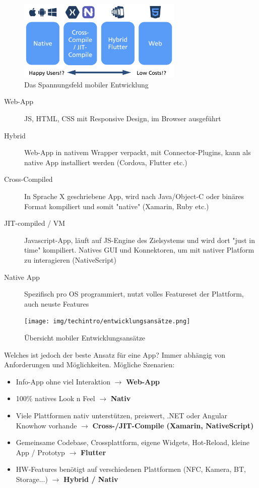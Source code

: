\documentclass[a4paper]{article}
\begin{document}
		\begin{figure}[htb!]
			\centering
			\includegraphics[width=0.7\textwidth]{img/techintro/spannungsfeld_apps.png}
			\caption{Das Spannungsfeld mobiler Entwicklung}
			\label{fig:techintro_spannungsfeld_apps}
		\end{figure}
	
		\begin{description}
			\item[Web-App] JS, HTML, CSS mit Responsive Design, im Browser ausgeführt
			\item[Hybrid] Web-App in nativem Wrapper verpackt, mit Connector-Plugins, kann als native App installiert werden (Cordova, Flutter etc.)
			\item[Cross-Compiled] In Sprache X geschriebene App, wird nach Java/Object-C oder binäres Format kompiliert und somit "native" (Xamarin, Ruby etc.)
			\item[JIT-compiled / VM] Javascript-App, läuft auf JS-Engine des Zielsystems und wird dort "just in time" kompiliert.
			Natives GUI und Konnektoren, um mit nativer Platform zu interagieren (NativeScript)
			\item[Native App] Spezifisch pro OS programmiert, nutzt volles Featureset der Plattform, auch neuste Features
		\end{description}
	
		\begin{figure}[htb!]
			\centering
			\texttt{[image: img/techintro/entwicklungsansätze.png]}
			\caption{Übersicht mobiler Entwicklungsansätze}
			\label{fig:techintro_entwicklungsansätze}
		\end{figure}
	
		\newpage
	
		Welches ist jedoch der beste Ansatz für eine App?
		Immer abhängig von Anforderungen und Möglichkeiten.
		Mögliche Szenarien:
		
		\begin{itemize}
			\item Info-App ohne viel Interaktion $\rightarrow$ \textbf{Web-App}
			\item 100\% natives Look n Feel $\rightarrow$ \textbf{Nativ}
			\item Viele Plattformen nativ unterstützen, preiswert, .NET oder Angular Knowhow vorhande $\rightarrow$ \textbf{Cross-/JIT-Compile (Xamarin, NativeScript)}
			\item Gemeinsame Codebase, Crossplattform, eigene Widgets, Hot-Reload, kleine App / Prototyp $\rightarrow$ \textbf{Flutter}
			\item HW-Features benötigt auf verschiedenen Plattformen (NFC, Kamera, BT, Storage...) $\rightarrow$ \textbf{Hybrid / Nativ}
		\end{itemize}
	
\end{document}

